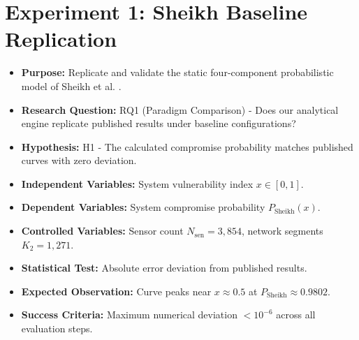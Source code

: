 \documentclass[12pt, oneside, a4paper]{report}
\theoremstyle{definition}
\theoremstyle{remark}
\begin{document}
\section{Experiment 1: Sheikh Baseline Replication}
\label{sec:ed:e1}
\begin{itemize}
  \item \textbf{Purpose:} Replicate and validate the static four-component probabilistic model of Sheikh et al. \cite{sheikh2020}.
  \item \textbf{Research Question:} RQ1 (Paradigm Comparison) - Does our analytical engine replicate published results under baseline configurations?
  \item \textbf{Hypothesis:} H1 - The calculated compromise probability matches published curves with zero deviation.
  \item \textbf{Independent Variables:} System vulnerability index $x \in [0, 1]$.
  \item \textbf{Dependent Variables:} System compromise probability $P_{\mathrm{Sheikh}}(x)$.
  \item \textbf{Controlled Variables:} Sensor count $N_{\mathrm{sen}} = 3{,}854$, network segments $K_2 = 1{,}271$.
  \item \textbf{Statistical Test:} Absolute error deviation from published results.
  \item \textbf{Expected Observation:} Curve peaks near $x \approx 0.5$ at $P_{\mathrm{Sheikh}} \approx 0.9802$.
  \item \textbf{Success Criteria:} Maximum numerical deviation $< 10^{-6}$ across all evaluation steps.
\end{itemize}
\end{document}
